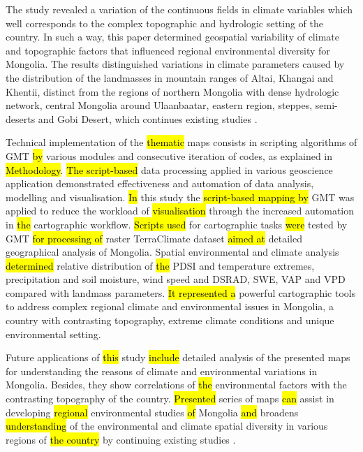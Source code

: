 \documentclass[geosciences,article,submit,pdftex,moreauthors]{Definitions/mdpi}
\begin{document}
The study revealed a variation of the continuous fields in climate variables which well corresponds to the complex topographic and hydrologic setting of the country. In such a way, this paper determined geospatial variability of climate and topographic factors that influenced regional environmental diversity for Mongolia. The results distinguished variations in climate parameters caused by the distribution of the landmasses in mountain ranges of Altai, Khangai and Khentii, distinct from the regions of northern Mongolia with dense hydrologic network, central Mongolia around Ulaanbaatar, eastern region, steppes, semi-deserts and Gobi Desert, which continues existing studies \cite{Cook,Ulaankhuu}. 

Technical implementation of the \hl{thematic} maps consists in scripting algorithms of GMT \hl{by} various modules and consecutive iteration of codes, as explained in \hl{Methodology}. \hl{The script-based} data processing applied in various geoscience application \cite{Lemenkova2019c,Lemenkov2021} demonstrated effectiveness and automation of data analysis, modelling and visualisation. \hl{In} this study the \hl{script-based mapping by} GMT was applied to reduce the workload of \hl{visualisation} through the increased automation in \hl{the} cartographic workflow. \hl{Scripts used} for cartographic tasks \hl{were} tested by GMT \hl{for processing of} raster TerraClimate dataset \hl{aimed at} detailed geographical analysis of Mongolia. Spatial environmental and climate analysis \hl{determined} relative distribution of \hl{the} PDSI and temperature extremes, precipitation and soil moisture, wind speed and DSRAD, SWE, VAP and VPD compared with landmass parameters. \hl{It represented a} powerful cartographic tools to address complex regional climate and environmental issues in Mongolia, a country with contrasting topography, extreme climate conditions and unique environmental setting. 

Future applications of \hl{this} study \hl{include} detailed analysis of the presented maps for understanding the reasons of climate and environmental variations in Mongolia. Besides, they show correlations of \hl{the} environmental factors with the contrasting topography of the country. \hl{Presented} series of maps \hl{can} assist in developing \hl{regional} environmental studies \hl{of} Mongolia \hl{and} broadens \hl{understanding} of the environmental and climate spatial diversity in various regions of \hl{the country} \cite{MAS,Pfeiffer} by continuing existing studies \cite{Altanbold,Jamyansuren,Jugder}. 
\end{document}
